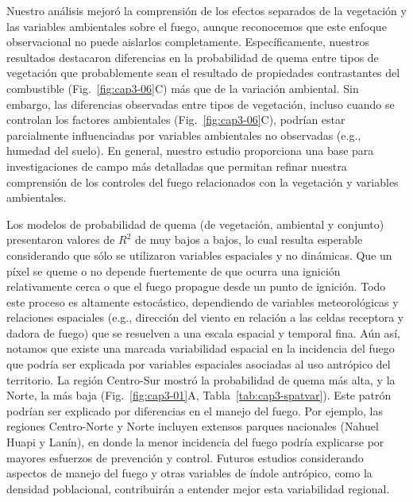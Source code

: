 Nuestro análisis mejoró la comprensión de los efectos separados de la vegetación y las variables ambientales sobre el fuego, aunque reconocemos que este enfoque observacional no puede aislarlos completamente. Específicamente, nuestros resultados destacaron diferencias en la probabilidad de quema entre tipos de vegetación que probablemente sean el resultado de propiedades contrastantes del combustible (Fig.~\ref{fig:cap3-06}C) más que de la variación ambiental. Sin embargo, las diferencias observadas entre tipos de vegetación, incluso cuando se controlan los factores ambientales (Fig.~\ref{fig:cap3-06}C), podrían estar parcialmente influenciadas por variables ambientales no observadas (e.g., humedad del suelo). En general, nuestro estudio proporciona una base para investigaciones de campo más detalladas que permitan refinar nuestra comprensión de los controles del fuego relacionados con la vegetación y variables ambientales.

Los modelos de probabilidad de quema (de vegetación, ambiental y conjunto) presentaron valores de $R^2$ de muy bajos a bajos, lo cual resulta esperable considerando que sólo se utilizaron variables espaciales y no dinámicas. Que un píxel se queme o no depende fuertemente de que ocurra una ignición relativamente cerca o que el fuego propague desde un punto de ignición. Todo este proceso es altamente estocástico, dependiendo de variables meteorológicas y relaciones espaciales (e.g., dirección del viento en relación a las celdas receptora y dadora de fuego) que se resuelven a una escala espacial y temporal fina. Aún así, notamos que existe una marcada variabilidad espacial en la incidencia del fuego que podría ser explicada por variables espaciales asociadas al uso antrópico del territorio. La región Centro-Sur mostró la probabilidad de quema más alta, y la Norte, la más baja (Fig.~\ref{fig:cap3-01}A, Tabla~\ref{tab:cap3-spatvar}). Este patrón podrían ser explicado por diferencias en el manejo del fuego. Por ejemplo, las regiones Centro-Norte y Norte incluyen extensos parques nacionales (Nahuel Huapi y Lanín), en donde la menor incidencia del fuego podría explicarse por mayores esfuerzos de prevención y control. Futuros estudios considerando aspectos de manejo del fuego y otras variables de índole antrópico, como la densidad poblacional, contribuirán a entender mejor esta variabilidad regional. 

